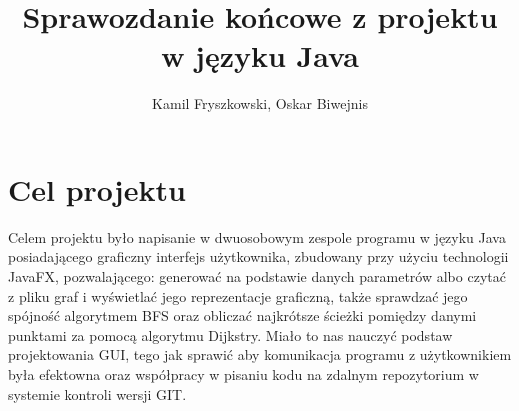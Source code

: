 \documentclass{article}
\title{Sprawozdanie końcowe z projektu w języku Java}
\author{Kamil Fryszkowski, Oskar Biwejnis}
\begin{document}
\maketitle
\thispagestyle{fancy}

\section{Cel projektu} 
Celem projektu było napisanie w dwuosobowym zespole programu w języku Java posiadającego graficzny interfejs użytkownika, zbudowany przy użyciu technologii JavaFX, pozwalającego: generować na podstawie danych parametrów albo czytać z pliku graf i wyświetlać jego reprezentacje graficzną, także sprawdzać jego spójność algorytmem BFS oraz obliczać najkrótsze ścieżki pomiędzy danymi punktami za pomocą algorytmu Dijkstry. Miało to nas nauczyć podstaw projektowania GUI, tego jak sprawić aby komunikacja programu z użytkownikiem była efektowna oraz współpracy w pisaniu kodu na zdalnym repozytorium w systemie kontroli wersji GIT.
\end{document}
